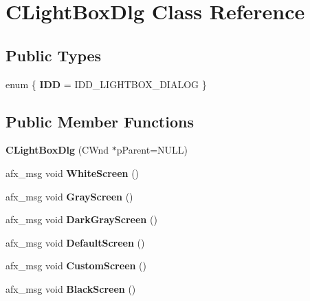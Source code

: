 \hypertarget{class_c_light_box_dlg}{\section{C\-Light\-Box\-Dlg Class Reference}
\label{class_c_light_box_dlg}
}
\subsection*{Public Types}
\begin{DoxyCompactItemize}
\item 
enum \{ {\bfseries I\-D\-D} =  I\-D\-D\-\_\-\-L\-I\-G\-H\-T\-B\-O\-X\-\_\-\-D\-I\-A\-L\-O\-G
 \}
\end{DoxyCompactItemize}
\subsection*{Public Member Functions}
\begin{DoxyCompactItemize}
\item 
\hypertarget{class_c_light_box_dlg_a0e55650e165ced89d55aaeb275f17434}{{\bfseries C\-Light\-Box\-Dlg} (C\-Wnd $\ast$p\-Parent=N\-U\-L\-L)}\label{class_c_light_box_dlg_a0e55650e165ced89d55aaeb275f17434}

\item 
\hypertarget{class_c_light_box_dlg_a2637a8b15b5952bd18f987782da49ed6}{afx\-\_\-msg void {\bfseries White\-Screen} ()}\label{class_c_light_box_dlg_a2637a8b15b5952bd18f987782da49ed6}

\item 
\hypertarget{class_c_light_box_dlg_a41b7400d491e64d8b02a31604fe7cb02}{afx\-\_\-msg void {\bfseries Gray\-Screen} ()}\label{class_c_light_box_dlg_a41b7400d491e64d8b02a31604fe7cb02}

\item 
\hypertarget{class_c_light_box_dlg_a180aaa9d6dd9a4b79779dac6ed8bfadb}{afx\-\_\-msg void {\bfseries Dark\-Gray\-Screen} ()}\label{class_c_light_box_dlg_a180aaa9d6dd9a4b79779dac6ed8bfadb}

\item 
\hypertarget{class_c_light_box_dlg_a2d26f29470734135bbc024427fa676e0}{afx\-\_\-msg void {\bfseries Default\-Screen} ()}\label{class_c_light_box_dlg_a2d26f29470734135bbc024427fa676e0}

\item 
\hypertarget{class_c_light_box_dlg_a224fe80ecf3f75d83180cfe5d6b9bb60}{afx\-\_\-msg void {\bfseries Custom\-Screen} ()}\label{class_c_light_box_dlg_a224fe80ecf3f75d83180cfe5d6b9bb60}

\item 
\hypertarget{class_c_light_box_dlg_a41468bdbbfb8670a7efb4d8905e15ae5}{afx\-\_\-msg void {\bfseries Black\-Screen} ()}\label{class_c_light_box_dlg_a41468bdbbfb8670a7efb4d8905e15ae5}

\end{DoxyCompactItemize}
